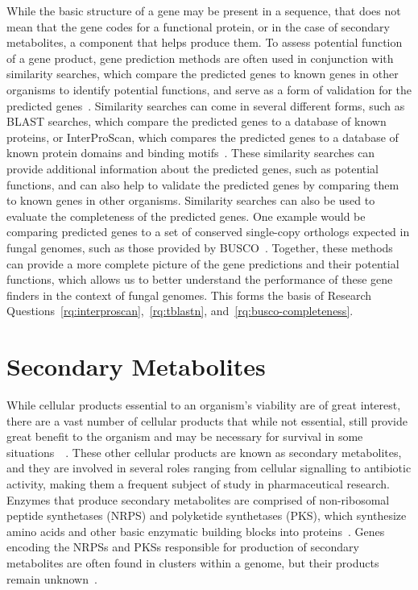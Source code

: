 While the basic structure of a gene may be present in a sequence, that does not mean that the gene codes for a functional protein, or in the case of secondary metabolites, a component that helps produce them. To assess potential function of a gene product, gene prediction methods are often used in conjunction with similarity searches, which compare the predicted genes to known genes in other organisms to identify potential functions, and serve as a form of validation for the predicted genes~\cite{loftus2003a}. 
Similarity searches can come in several different forms, such as BLAST searches, which compare the predicted genes to a database of known proteins, or InterProScan, which compares the predicted genes to a database of known protein domains and binding motifs~\cite{loftus2003a}. These similarity searches can provide additional information about the predicted genes, such as potential functions, and can also help to validate the predicted genes by comparing them to known genes in other organisms. Similarity searches can also be used to evaluate the completeness of the predicted genes. One example would be comparing predicted genes to a set of conserved single-copy orthologs expected in fungal genomes, such as those provided by BUSCO~\cite{manni2021a}. Together, these methods can provide a more complete picture of the gene predictions and their potential functions, which allows us to better understand the performance of these gene finders in the context of fungal genomes. This forms the basis of Research Questions~\ref{rq:interproscan},~\ref{rq:tblastn}, and~\ref{rq:busco-completeness}.

\section{Secondary Metabolites}
\label{lit:secondary-metabolites}

While cellular products essential to an organism's viability are
of great interest, there are a vast number of cellular products that while not
essential, still provide great benefit to the
organism and may be necessary for survival in some situations~\cite{Craney2013}~\cite{Mukherjee2012}. These other cellular products are known
 as secondary metabolites, and they are involved in several roles ranging 
 from cellular signalling to antibiotic activity, making them a frequent 
 subject of study in pharmaceutical research. Enzymes that produce 
 secondary metabolites are comprised of non-ribosomal peptide synthetases 
 (NRPS) and polyketide synthetases (PKS), which synthesize amino acids and 
 other basic enzymatic building blocks into proteins~\cite{komaki2020}. 
 Genes encoding the NRPSs and PKSs responsible for production of secondary 
 metabolites are often found in clusters within a genome, but their 
 products remain unknown~\cite{Mukherjee2012}. 
 
